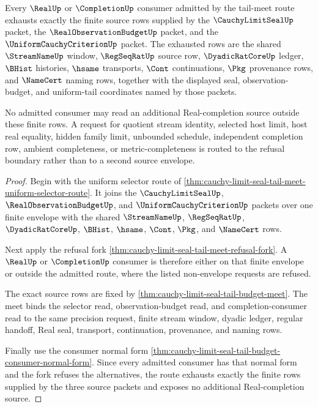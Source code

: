 \begin{theorem}
\label{thm:cauchy-limit-seal-tail-meet-source-exhaustion}
Every $\RealUp$ or $\CompletionUp$ consumer admitted by the tail-meet route exhausts exactly the finite source rows supplied by the $\CauchyLimitSealUp$ packet, the $\RealObservationBudgetUp$ packet, and the $\UniformCauchyCriterionUp$ packet. The exhausted rows are the shared $\StreamNameUp$ window, $\RegSeqRatUp$ source row, $\DyadicRatCoreUp$ ledger, $\BHist$ histories, $\hsame$ transports, $\Cont$ continuations, $\Pkg$ provenance rows, and $\NameCert$ naming rows, together with the displayed seal, observation-budget, and uniform-tail coordinates named by those packets.

No admitted consumer may read an additional Real-completion source outside these finite rows. A request for quotient stream identity, selected host limit, host real equality, hidden family limit, unbounded schedule, independent completion row, ambient completeness, or metric-completeness is routed to the refusal boundary rather than to a second source envelope.
\end{theorem}
\begin{proof}
Begin with the uniform selector route of \autoref{thm:cauchy-limit-seal-tail-meet-uniform-selector-route}. It joins the $\CauchyLimitSealUp$, $\RealObservationBudgetUp$, and $\UniformCauchyCriterionUp$ packets over one finite envelope with the shared $\StreamNameUp$, $\RegSeqRatUp$, $\DyadicRatCoreUp$, $\BHist$, $\hsame$, $\Cont$, $\Pkg$, and $\NameCert$ rows.

Next apply the refusal fork \autoref{thm:cauchy-limit-seal-tail-meet-refusal-fork}. A $\RealUp$ or $\CompletionUp$ consumer is therefore either on that finite envelope or outside the admitted route, where the listed non-envelope requests are refused.

The exact source rows are fixed by \autoref{thm:cauchy-limit-seal-tail-budget-meet}. The meet binds the selector read, observation-budget read, and completion-consumer read to the same precision request, finite stream window, dyadic ledger, regular handoff, Real seal, transport, continuation, provenance, and naming rows.

Finally use the consumer normal form \autoref{thm:cauchy-limit-seal-tail-budget-consumer-normal-form}. Since every admitted consumer has that normal form and the fork refuses the alternatives, the route exhausts exactly the finite rows supplied by the three source packets and exposes no additional Real-completion source.
\end{proof}

